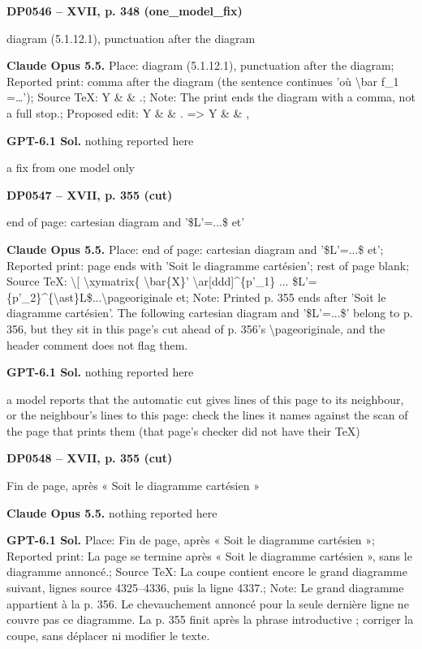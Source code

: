 \par\noindent\hypertarget{DP0546}{}\textbf{DP0546 -- XVII, p. 348 (one\_model\_fix)}\par
diagram (5.1.12.1), punctuation after the diagram\par
\textbf{Claude Opus 5.5.} Place: diagram (5.1.12.1), punctuation after the diagram; Reported print: comma after the diagram (the sentence continues 'où \textbackslash{}bar f\_1 =\allowbreak  …'); Source TeX: Y   \& \& .; Note: The print ends the diagram with a comma, not a full stop.; Proposed edit: Y   \& \& . =\allowbreak > Y   \& \& ,\par
\textbf{GPT-6.1 Sol.} nothing reported here\par
a fix from one model only\par
\par\noindent\hypertarget{DP0547}{}\textbf{DP0547 -- XVII, p. 355 (cut)}\par
end of page: cartesian diagram and '\$L'=\allowbreak ...\$ et'\par
\textbf{Claude Opus 5.5.} Place: end of page: cartesian diagram and '\$L'=\allowbreak ...\$ et'; Reported print: page ends with 'Soit le diagramme cartésien'; rest of page blank; Source TeX: \textbackslash{}[ \textbackslash{}xymatrix\{   \textbackslash{}bar\{X\}' \textbackslash{}ar[ddd]\textasciicircum{}\{p'\_1\} ... \$L'=\allowbreak \{p'\_2\}\textasciicircum{}\{\textbackslash{}ast\}L\$...\textbackslash{}pageoriginale et; Note: Printed p. 355 ends after 'Soit le diagramme cartésien'. The following cartesian diagram and '\$L'=\allowbreak ...\$' belong to p. 356, but they sit in this page's cut ahead of p. 356's \textbackslash{}pageoriginale, and the header comment does not flag them.\par
\textbf{GPT-6.1 Sol.} nothing reported here\par
a model reports that the automatic cut gives lines of this page to its neighbour, or the neighbour's lines to this page: check the lines it names against the scan of the page that prints them (that page's checker did not have their TeX)\par
\par\noindent\hypertarget{DP0548}{}\textbf{DP0548 -- XVII, p. 355 (cut)}\par
Fin de page, après « Soit le diagramme cartésien »\par
\textbf{Claude Opus 5.5.} nothing reported here\par
\textbf{GPT-6.1 Sol.} Place: Fin de page, après « Soit le diagramme cartésien »; Reported print: La page se termine après « Soit le diagramme cartésien », sans le diagramme annoncé.; Source TeX: La coupe contient encore le grand diagramme suivant, lignes source 4325–4336, puis la ligne 4337.; Note: Le grand diagramme appartient à la p. 356. Le chevauchement annoncé pour la seule dernière ligne ne couvre pas ce diagramme. La p. 355 finit après la phrase introductive ; corriger la coupe, sans déplacer ni modifier le texte.\par
